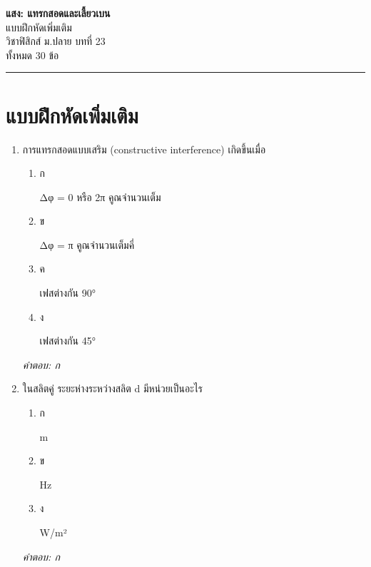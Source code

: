 \documentclass[12pt]{article}
\begin{document}
\begin{center}
{\Large\textbf{แสง: แทรกสอดและเลี้ยวเบน}}\\[6pt]
{\normalsize แบบฝึกหัดเพิ่มเติม}\\[6pt]
{\normalsize วิชาฟิสิกส์ ม.ปลาย บทที่ 23}\\[4pt]
{\footnotesize ทั้งหมด 30 ข้อ}
\end{center}
\hrule
\bigskip

\section*{แบบฝึกหัดเพิ่มเติม}
\begin{enumerate}[label=\arabic*., itemsep=0.5\baselineskip, topsep=0.5\baselineskip, leftmargin=*]
\item การแทรกสอดแบบเสริม (constructive interference) เกิดขึ้นเมื่อ
\begin{enumerate}[label=\alph*)., itemsep=0.3\baselineskip, topsep=0.3\baselineskip]
\item ก\ 
\begin{minipage}[t]{0.9\linewidth}
\raggedright Δφ = 0 หรือ 2π คูณจำนวนเต็ม
\end{minipage}
\item ข\ 
\begin{minipage}[t]{0.9\linewidth}
\raggedright Δφ = π คูณจำนวนเต็มคี่
\end{minipage}
\item ค\ 
\begin{minipage}[t]{0.9\linewidth}
\raggedright เฟสต่างกัน 90°
\end{minipage}
\item ง\ 
\begin{minipage}[t]{0.9\linewidth}
\raggedright เฟสต่างกัน 45°
\end{minipage}
\end{enumerate}
\vspace{-0.3\baselineskip}
\begin{small}
\textit{คำตอบ: ก}
\end{small}

\item ในสลิตคู่ ระยะห่างระหว่างสลิต d มีหน่วยเป็นอะไร
\begin{enumerate}[label=\alph*)., itemsep=0.3\baselineskip, topsep=0.3\baselineskip]
\item ก\ 
\begin{minipage}[t]{0.9\linewidth}
\raggedright m
\end{minipage}
\item ข\ 
\begin{minipage}[t]{0.9\linewidth}
\raggedright Hz
\end{minipage}
\item ง\ 
\begin{minipage}[t]{0.9\linewidth}
\raggedright W/m²
\end{minipage}
\end{enumerate}
\vspace{-0.3\baselineskip}
\begin{small}
\textit{คำตอบ: ก}
\end{small}


\end{enumerate}
\end{document}

